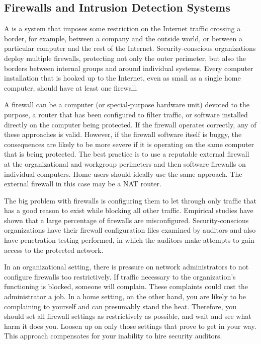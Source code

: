 \subsection{Firewalls and Intrusion Detection
  Systems}\label{fw-ids-section}

A  is a system that imposes some restriction on the
Internet traffic crossing a border, for example, between a company and
the outside world, or between a particular computer and the rest of
the Internet.  Security-conscious organizations deploy multiple
firewalls, protecting not only the outer perimeter, but also the
borders between internal groups and around individual systems.  Every
computer installation that is hooked up to the Internet, even as small
as a single home computer, should have at least one firewall.

A firewall can be a computer (or special-purpose hardware unit) devoted
to the purpose, a router that has been configured to filter traffic,
or software installed directly on the computer being protected.  If
the firewall operates correctly, any of these approaches is valid.
However, if the firewall software itself is buggy, the consequences
are likely to be more severe if it is operating on the same computer
that is being protected.  The best practice is to use a reputable
external firewall at the organizational and workgroup perimeters and
then software firewalls on individual computers.  Home users should
ideally use the same approach.  The external firewall in this case may
be a NAT router.

The big problem with firewalls is configuring them to let through only
traffic that has a good reason to exist while blocking all other
traffic.  Empirical studies have shown that a large percentage of
firewalls are misconfigured.  Security-conscious organizations have
their firewall configuration files examined by auditors and also have
penetration testing performed, in which the auditors make attempts to
gain access to the protected network.

In an organizational setting, there is pressure on network
administrators to not configure firewalls too restrictively.  If
traffic necessary to the organization's functioning is blocked,
someone will complain.  These complaints could cost the administrator
a job.  In a home setting, on the other hand, you are likely to be
complaining to yourself and can presumably stand the heat.
Therefore, you should set all firewall settings as restrictively as
possible, and wait and see what harm it does you.  Loosen up on
only those settings that prove to get in your way.  This approach
compensates for your inability to hire security auditors.

